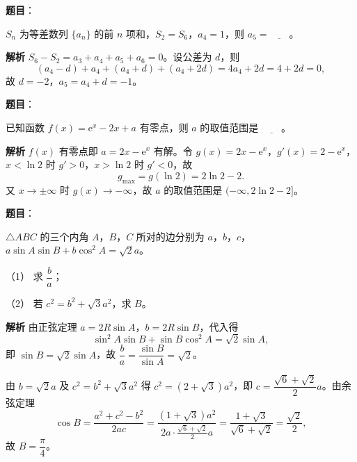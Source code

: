\begin{answer}

\textbf{题目}：

$S_n$ 为等差数列 $\{a_n\}$ 的前 $n$ 项和，$S_2=S_6$，$a_4=1$，则 $a_5=\underline{\qquad}$。

\textbf{解析}
$S_6-S_2=a_3+a_4+a_5+a_6=0$。设公差为 $d$，则
\nopagebreak[4]
\[(a_4-d)+a_4+(a_4+d)+(a_4+2d)=4a_4+2d=4+2d=0,\]
故 $d=-2$，$a_5=a_4+d=-1$。


\end{answer}
\begin{answer}

\textbf{题目}：

已知函数 $f(x)=\mathrm e^x-2x+a$ 有零点，则 $a$ 的取值范围是 $\underline{\qquad}$。

\textbf{解析}
$f(x)$ 有零点即 $a=2x-\mathrm e^x$ 有解。令 $g(x)=2x-\mathrm e^x$，$g'(x)=2-\mathrm e^x$，$x<\ln2$ 时 $g'>0$，$x>\ln2$ 时 $g'<0$，故
\nopagebreak[4]
\[g_{\max}=g(\ln2)=2\ln2-2.\]
又 $x\to\pm\infty$ 时 $g(x)\to-\infty$，故 $a$ 的取值范围是 $(-\infty,2\ln2-2]$。


\end{answer}
\begin{answer}

\textbf{题目}：

$\triangle ABC$ 的三个内角 $A$，$B$，$C$ 所对的边分别为 $a$，$b$，$c$，$a\sin A\sin B+b\cos^2A=\sqrt2a$。

（1） 求 $\dfrac ba$；

（2） 若 $c^2=b^2+\sqrt3a^2$，求 $B$。

\textbf{解析}
由正弦定理 $a=2R\sin A$，$b=2R\sin B$，代入得
\nopagebreak[4]
\[\sin^2A\sin B+\sin B\cos^2A=\sqrt2\sin A,\]
即 $\sin B=\sqrt2\sin A$，故 $\dfrac ba=\dfrac{\sin B}{\sin A}=\sqrt2$。

由 $b=\sqrt2a$ 及 $c^2=b^2+\sqrt3a^2$ 得 $c^2=(2+\sqrt3)a^2$，即 $c=\dfrac{\sqrt6+\sqrt2}2a$。由余弦定理
\nopagebreak[4]
\[\cos B=\frac{a^2+c^2-b^2}{2ac}=\frac{(1+\sqrt3)a^2}{2a\cdot\frac{\sqrt6+\sqrt2}2a}=\frac{1+\sqrt3}{\sqrt6+\sqrt2}=\frac{\sqrt2}2,\]
故 $B=\dfrac\pi4$。



\end{answer}
